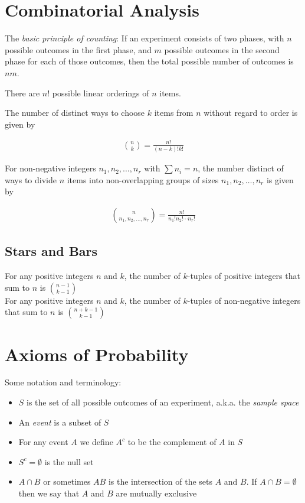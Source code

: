\documentclass[10pt]{article}
\begin{document}
		
		\section{Combinatorial Analysis}
		
		The \emph{basic principle of counting}: If an experiment consists of two phases, with $n$ possible outcomes in the first phase, and $m$ possible outcomes in the second phase for each of those outcomes, then the total possible number of outcomes is $nm$.
		
		There are $n!$ possible linear orderings of $n$ items.
		
		The number of distinct ways to choose $k$ items from $n$ without regard to order is given by
		
		\begin{align*}
			{n \choose k} = \frac{n!}{(n-k)!k!}
		\end{align*}
		
		For non-negative integers $n_1,n_2,\ldots, n_r$ with $\sum n_i = n$, the number distinct of ways to divide $n$ items into non-overlapping groups of sizes $n_1, n_2,\ldots, n_r$ is given by
		
		\begin{align*}
			{n \choose {n_1, n_2,\ldots, n_r}} = \frac{n!}{n_1!n_2! \cdots n_r!}
		\end{align*}
		
		\subsection*{Stars and Bars}
		For any positive integers $n$ and $k$, the number of $k$-tuples of positive integers that sum to $n$ is ${{n-1}\choose {k-1}}$\\
		For any positive integers $n$ and $k$, the number of $k$-tuples of non-negative integers that sum to $n$ is ${{n+k-1}\choose {k-1}}$
		\section{Axioms of Probability}
		
		Some notation and terminology:
		
		\begin{itemize}
			\item $S$ is the set of all possible outcomes of an experiment, a.k.a. the \emph{sample space}
			\item An \emph{event} is a subset of $S$
			\item For any event $A$ we define $A^c$ to be the complement of $A$ in $S$
			\item $S^c=\emptyset$ is the null set
			\item $A\cap B$ or sometimes $AB$ is the intersection of the sets $A$ and $B$. If $A\cap B = \emptyset$ then we say that $A$ and $B$ are mutually exclusive
		\end{itemize}
		
\end{document}
